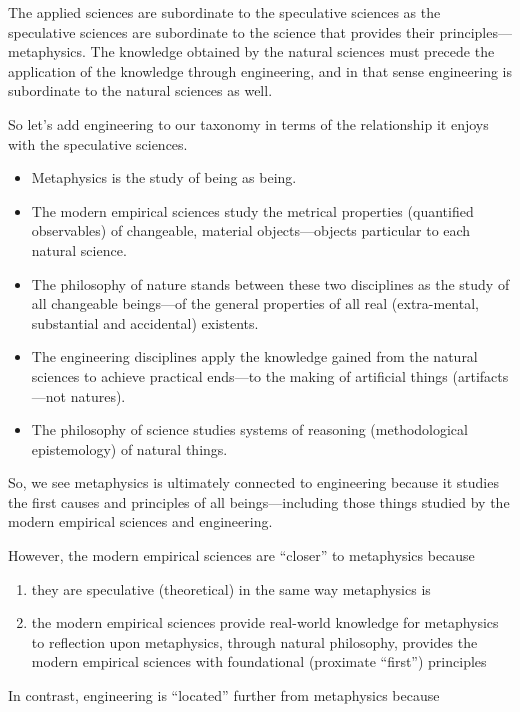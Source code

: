 The applied sciences are subordinate to the speculative sciences as the speculative sciences are subordinate to the science that provides their principles—metaphysics. The knowledge obtained by the natural sciences must precede the application of the knowledge through engineering, and in that sense engineering is subordinate to the natural sciences as well.

So let’s add engineering to our taxonomy in terms of the relationship it enjoys with the speculative sciences.

\begin{itemize}
\item Metaphysics is the study of being as being.
\item The modern empirical sciences study the metrical properties (quantified observables) of changeable, material objects—objects particular to each natural science.
\item The philosophy of nature stands between these two disciplines as the study of all changeable beings—of the general properties of all real (extra-mental, substantial and accidental) existents.
\item The engineering disciplines apply the knowledge gained from the natural sciences to achieve practical ends—to the making of artificial things (artifacts—not natures).
\item The philosophy of science studies systems of reasoning (methodological epistemology) of natural things.
\end{itemize}

So, we see metaphysics is ultimately connected to engineering because it studies the first causes and principles of all beings—including those things studied by the modern empirical sciences and engineering.

However, the modern empirical sciences are “closer” to metaphysics because

\begin{enumerate}
\item they are speculative (theoretical) in the same way metaphysics is
\item the modern empirical sciences provide real-world knowledge for metaphysics to reflection upon
metaphysics, through natural philosophy, provides the modern empirical sciences with foundational (proximate “first”) principles
\end{enumerate}

In contrast, engineering is “located” further from metaphysics because

